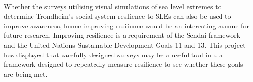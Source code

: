 \paragraph{}

Whether the surveys utilising visual simulations of sea level extremes to determine Trondheim's social system resilience to SLEs can also be used to improve awareness, hence improving resilience would be an interesting avenue for future research. Improving resilience is a requirement of the Sendai framework and the United Nations Sustainable Development Goals 11 and 13. This project has displayed that carefully designed surveys may be a useful tool in a  a framework designed to repeatedly measure resilience to see whether these goals are being met.